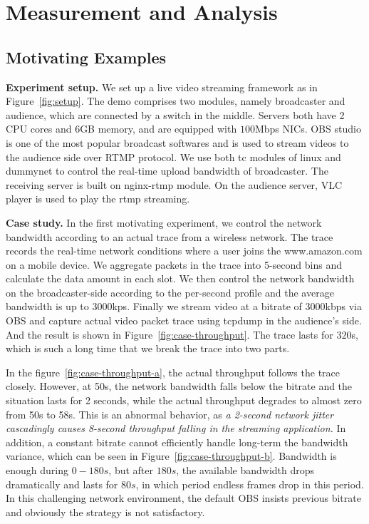 \section{Measurement and Analysis}
\subsection{Motivating Examples}

\textbf{Experiment setup.} We set up a live video streaming framework as in Figure~\ref{fig:setup}. The demo comprises two modules, namely broadcaster and audience, which are connected by a switch in the middle. Servers both have 2 CPU cores and 6GB memory, and are equipped with $100$Mbps NICs. OBS studio\cite{OBS} is one of the most popular broadcast softwares and is used to stream videos to the audience side over RTMP protocol. We use both tc modules of linux and dummynet\cite{dummynet} to control the real-time upload bandwidth of broadcaster. The receiving server is built on nginx-rtmp module. On the audience server, VLC player is used to play the rtmp streaming.


\textbf{Case study.} In the first motivating experiment, we control the network bandwidth according to an actual trace from a wireless network. The trace records the real-time network conditions where a user joins the www.amazon.com on a mobile device. We aggregate packets in the trace into 5-second bins and calculate the data amount in each slot. We then control the network bandwidth on the broadcaster-side according to the per-second profile and the average bandwidth is up to $3000$kps. Finally we stream video at a bitrate of $3000$kbps via OBS and capture actual video packet trace using tcpdump in the audience's side. And the result is shown in Figure~\ref{fig:case-throughput}.  The trace lasts for $320$s, which is such a long time that we break the trace into two parts.

In the figure~\ref{fig:case-throughput-a}, the actual throughput follows the trace closely. However, at 50s, the network bandwidth falls below the bitrate and the situation lasts for 2 seconds, while the actual throughput degrades to almost zero from 50s to 58s. This is an abnormal behavior, as \textit{a 2-second network jitter cascadingly causes 8-second throughput falling in the streaming application.} In addition, a constant bitrate cannot efficiently handle long-term the bandwidth variance, which can be seen in Figure~\ref{fig:case-throughput-b}. Bandwidth is enough during $0-180s$, but after $180s$, the available bandwidth drops dramatically and lasts for $80s$, in which period endless frames drop in this period. In this challenging network environment, the default OBS insists previous bitrate and obviously the strategy is not satisfactory.

